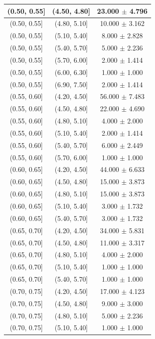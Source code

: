 \begin{longtable}{|c|c|c|}
\hline
(0.50, 0.55] & (4.50, 4.80] & 23.000 $\pm$ 4.796 \\ 
\hline
(0.50, 0.55] & (4.80, 5.10] & 10.000 $\pm$ 3.162 \\ 
\hline
(0.50, 0.55] & (5.10, 5.40] & 8.000 $\pm$ 2.828 \\ 
\hline
(0.50, 0.55] & (5.40, 5.70] & 5.000 $\pm$ 2.236 \\ 
\hline
(0.50, 0.55] & (5.70, 6.00] & 2.000 $\pm$ 1.414 \\ 
\hline
(0.50, 0.55] & (6.00, 6.30] & 1.000 $\pm$ 1.000 \\ 
\hline
(0.50, 0.55] & (6.90, 7.50] & 2.000 $\pm$ 1.414 \\ 
\hline
(0.55, 0.60] & (4.20, 4.50] & 56.000 $\pm$ 7.483 \\ 
\hline
(0.55, 0.60] & (4.50, 4.80] & 22.000 $\pm$ 4.690 \\ 
\hline
(0.55, 0.60] & (4.80, 5.10] & 4.000 $\pm$ 2.000 \\ 
\hline
(0.55, 0.60] & (5.10, 5.40] & 2.000 $\pm$ 1.414 \\ 
\hline
(0.55, 0.60] & (5.40, 5.70] & 6.000 $\pm$ 2.449 \\ 
\hline
(0.55, 0.60] & (5.70, 6.00] & 1.000 $\pm$ 1.000 \\ 
\hline
(0.60, 0.65] & (4.20, 4.50] & 44.000 $\pm$ 6.633 \\ 
\hline
(0.60, 0.65] & (4.50, 4.80] & 15.000 $\pm$ 3.873 \\ 
\hline
(0.60, 0.65] & (4.80, 5.10] & 15.000 $\pm$ 3.873 \\ 
\hline
(0.60, 0.65] & (5.10, 5.40] & 3.000 $\pm$ 1.732 \\ 
\hline
(0.60, 0.65] & (5.40, 5.70] & 3.000 $\pm$ 1.732 \\ 
\hline
(0.65, 0.70] & (4.20, 4.50] & 34.000 $\pm$ 5.831 \\ 
\hline
(0.65, 0.70] & (4.50, 4.80] & 11.000 $\pm$ 3.317 \\ 
\hline
(0.65, 0.70] & (4.80, 5.10] & 4.000 $\pm$ 2.000 \\ 
\hline
(0.65, 0.70] & (5.10, 5.40] & 1.000 $\pm$ 1.000 \\ 
\hline
(0.65, 0.70] & (5.40, 5.70] & 1.000 $\pm$ 1.000 \\ 
\hline
(0.70, 0.75] & (4.20, 4.50] & 17.000 $\pm$ 4.123 \\ 
\hline
(0.70, 0.75] & (4.50, 4.80] & 9.000 $\pm$ 3.000 \\ 
\hline
(0.70, 0.75] & (4.80, 5.10] & 5.000 $\pm$ 2.236 \\ 
\hline
(0.70, 0.75] & (5.10, 5.40] & 1.000 $\pm$ 1.000 \\ 

\end{longtable}
